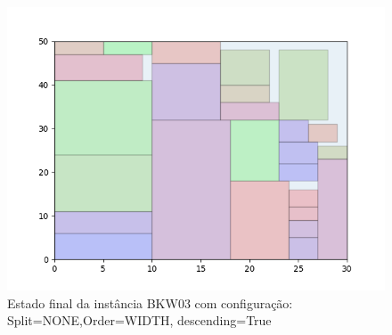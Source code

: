 \begin{figure}[H]
    \centering
    \caption[]{Estado final da instância BKW03 com configuração: Split=NONE,Order=WIDTH, descending=True}
    \label{fig:bkw03-none-width-true}
    \includegraphics[scale=0.5]{output/figures/bkw/bkw03/none/width/true/00}
\end{figure}